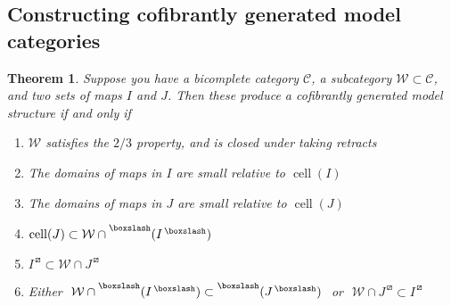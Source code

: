 \documentclass{amsart}
\DeclareMathOperator{\cell}{cell}
\newtheorem{theorem}{Theorem}[subsection]
\theoremstyle{definition}
\begin{document}
  \subsection{Constructing cofibrantly generated model categories}
  \begin{theorem}
    Suppose you have a bicomplete category $\mathcal{C}$, a subcategory
    $\mathcal{W}\subset \mathcal{C}$, and two sets of maps
    $I$ and $J$. Then these produce a cofibrantly generated model
    structure if and only if
    \begin{enumerate}
    \item $\mathcal{W}$ satisfies the $2/3$ property,
      and is closed under taking retracts
    \item The domains of maps in $I$ are small relative to $\cell(I)$
    \item The domains of maps in $J$ are small relative to $\cell(J)$
    \item $\cell(J)\subset \mathcal{W}\cap \prescript{\boxslash}{}{
        (I^{\,\boxslash})}$
    \item $I^{\,\boxslash}\subset \mathcal{W}\cap J^{\,\boxslash}$
    \item Either \,\,$\mathcal{W}\cap \prescript{\boxslash}{}{
        (I^{\,\boxslash})} \subset \prescript{\boxslash}{}{
        (J^{\,\boxslash})}$ \,\,or\,\, 
      $\mathcal{W}\cap J^{\,\boxslash}\subset I^{\,\boxslash}$
    \end{enumerate}
  \end{theorem}
\end{document}
